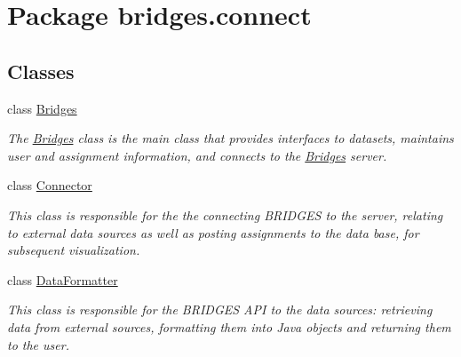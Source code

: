 \hypertarget{namespacebridges_1_1connect}{}\section{Package bridges.\+connect}
\label{namespacebridges_1_1connect}
\subsection*{Classes}
\begin{DoxyCompactItemize}
\item 
class \mbox{\hyperlink{classbridges_1_1connect_1_1_bridges}{Bridges}}
\begin{DoxyCompactList}\small\item\em The \mbox{\hyperlink{classbridges_1_1connect_1_1_bridges}{Bridges}} class is the main class that provides interfaces to datasets, maintains user and assignment information, and connects to the \mbox{\hyperlink{classbridges_1_1connect_1_1_bridges}{Bridges}} server. \end{DoxyCompactList}\item 
class \mbox{\hyperlink{classbridges_1_1connect_1_1_connector}{Connector}}
\begin{DoxyCompactList}\small\item\em This class is responsible for the the connecting B\+R\+I\+D\+G\+ES to the server, relating to external data sources as well as posting assignments to the data base, for subsequent visualization. \end{DoxyCompactList}\item 
class \mbox{\hyperlink{classbridges_1_1connect_1_1_data_formatter}{Data\+Formatter}}
\begin{DoxyCompactList}\small\item\em This class is responsible for the B\+R\+I\+D\+G\+ES A\+PI to the data sources\+: retrieving data from external sources, formatting them into Java objects and returning them to the user. \end{DoxyCompactList}\end{DoxyCompactItemize}
